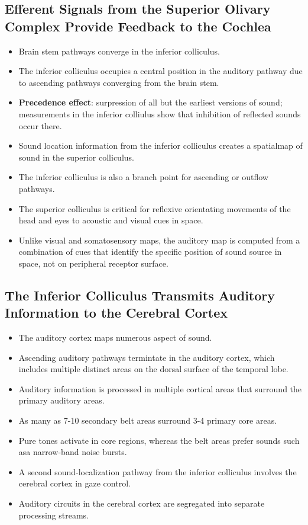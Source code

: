 \documentclass[12pt,a4paper]{article}
\begin{document}
\subsection{Efferent Signals from the Superior Olivary Complex Provide Feedback to the Cochlea}
\begin{itemize}
    \item Brain stem pathways converge in the inferior colliculus.
    \item The inferior colliculus occupies a central position in the auditory pathway due to ascending pathways converging from the brain stem.
    \item \textbf{Precedence effect}: surpression of all but the earliest versions of sound; measurements in the inferior colliulus show that inhibition of reflected sounds occur there.
    \item Sound location information from the inferior colliculus creates a spatialmap of sound in the superior colliculus.
    \item The inferior colliculus is also a branch point for ascending or outflow pathways.
    \item The superior colliculus is critical for reflexive orientating movements of the head and eyes to acoustic and visual cues in space.
    \item Unlike visual and somatosensory maps, the auditory map is computed from a combination of cues that identify the specific position of sound source in space, not on peripheral receptor surface.
\end{itemize}

\subsection{The Inferior Colliculus Transmits Auditory Information to the Cerebral Cortex}
\begin{itemize}
    \item The auditory cortex maps numerous aspect of sound.
    \item Ascending auditory pathways termintate in the auditory cortex, which includes multiple distinct areas on the dorsal surface of the temporal lobe.
    \item Auditory information is processed in multiple cortical areas that surround the primary auditory areas.
    \item As many as 7-10 secondary belt areas surround 3-4 primary core areas.
    \item Pure tones activate in core regions, whereas the belt areas prefer sounds such asa narrow-band noise bursts.
    \item A second sound-localization pathway from the inferior colliculus involves the cerebral cortex in gaze control.
    \item Auditory circuits in the cerebral cortex are segregated into separate processing streams.
\end{itemize}
\end{document}
